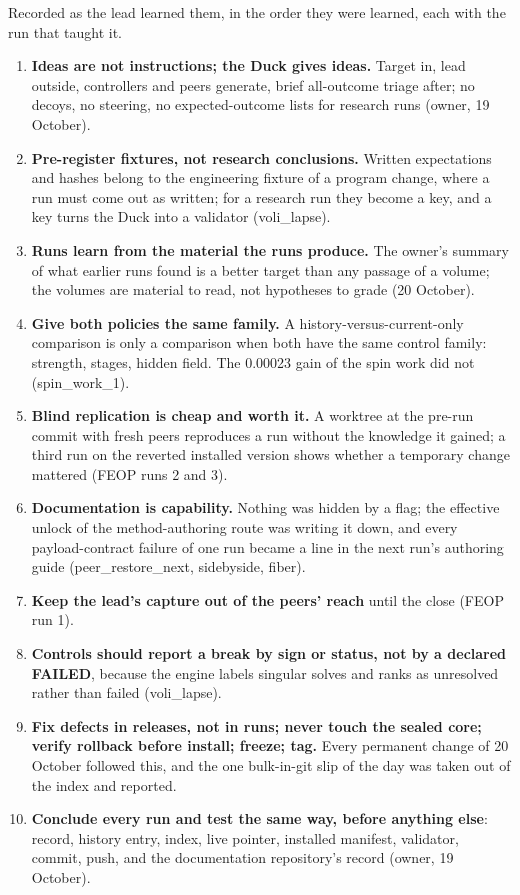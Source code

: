 Recorded as the lead learned them, in the order they were learned, each with the run that taught it.

\begin{enumerate}
\def\labelenumi{\arabic{enumi}.}
\tightlist
\item
  \textbf{Ideas are not instructions; the Duck gives ideas.} Target in, lead outside, controllers and peers generate, brief all-outcome triage after;
  no decoys, no steering, no expected-outcome lists for research runs (owner, 19 October).
\item
  \textbf{Pre-register fixtures, not research conclusions.} Written expectations and hashes belong to the engineering fixture of a program change,
  where a run must come out as written; for a research run they become a key, and a key turns the Duck into a validator (voli\_lapse).
\item
  \textbf{Runs learn from the material the runs produce.} The owner's summary of what earlier runs found is a better target than any passage of a
  volume; the volumes are material to read, not hypotheses to grade (20 October).
\item
  \textbf{Give both policies the same family.} A history-versus-current-only comparison is only a comparison when both have the same control family:
  strength, stages, hidden field. The 0.00023 gain of the spin work did not (spin\_work\_1).
\item
  \textbf{Blind replication is cheap and worth it.} A worktree at the pre-run commit with fresh peers reproduces a run without the knowledge it
  gained; a third run on the reverted installed version shows whether a temporary change mattered (FEOP runs 2 and 3).
\item
  \textbf{Documentation is capability.} Nothing was hidden by a flag; the effective unlock of the method-authoring route was writing it down, and
  every payload-contract failure of one run became a line in the next run's authoring guide (peer\_restore\_next, sidebyside, fiber).
\item
  \textbf{Keep the lead's capture out of the peers' reach} until the close (FEOP run 1).
\item
  \textbf{Controls should report a break by sign or status, not by a declared FAILED}, because the engine labels singular solves and ranks as
  unresolved rather than failed (voli\_lapse).
\item
  \textbf{Fix defects in releases, not in runs; never touch the sealed core; verify rollback before install; freeze; tag.} Every permanent change of
  20 October followed this, and the one bulk-in-git slip of the day was taken out of the index and reported.
\item
  \textbf{Conclude every run and test the same way, before anything else}: record, history entry, index, live pointer, installed manifest, validator,
  commit, push, and the documentation repository's record (owner, 19 October).
\end{enumerate}

